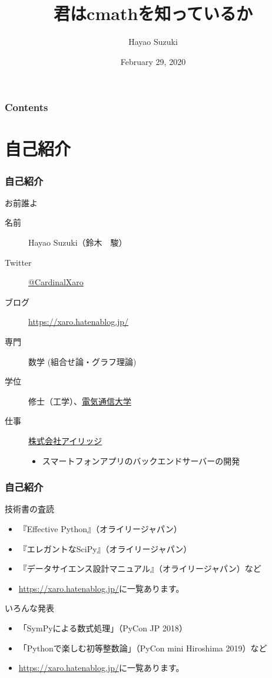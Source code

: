 \documentclass[dvipdfmx,11pt,notheorems]{beamer}
\title[All about cmath module]{君はcmathを知っているか}
\author[Hayao]{Hayao Suzuki}
\institute[Shizuoka 2020]{PyCon mini Shizuoka 2020}
\date{February 29, 2020}
\theoremstyle{definition}
\begin{document}
\begin{frame}[plain]\frametitle{}
\titlepage %
\end{frame}

\begin{frame}\frametitle{Contents}
\tableofcontents %
\end{frame}

\section{自己紹介}

\begin{frame}\frametitle{自己紹介}

\begin{block}{お前誰よ}
\begin{description}
\item[名前] Hayao Suzuki（鈴木　駿）
\item[Twitter] \href{https://twitter.com/CardinalXaro}{@CardinalXaro}
\item[ブログ] \url{https://xaro.hatenablog.jp/}
\item[専門] 数学 (組合せ論・グラフ理論)
\item[学位] 修士（工学）、\href{https://www.uec.ac.jp/}{電気通信大学}
\item[仕事] \href{https://iridge.jp/}{株式会社アイリッジ}
\begin{itemize}
\item スマートフォンアプリのバックエンドサーバーの開発
\end{itemize}
\end{description}
\end{block}

\end{frame}

\begin{frame}\frametitle{自己紹介}

\begin{block}{技術書の査読}
\begin{itemize}
\item 『Effective Python』（オライリージャパン）
\item 『エレガントなSciPy』（オライリージャパン）
\item 『データサイエンス設計マニュアル』（オライリージャパン）など
\item \url{https://xaro.hatenablog.jp/}に一覧あります。
\end{itemize}
\end{block}

\begin{block}{いろんな発表}
\begin{itemize}
\item 「SymPyによる数式処理」（PyCon JP 2018）
\item 「Pythonで楽しむ初等整数論」（PyCon mini Hiroshima 2019）など
\item \url{https://xaro.hatenablog.jp/}に一覧あります。
\end{itemize}
\end{block}

\end{frame}
\end{document}
